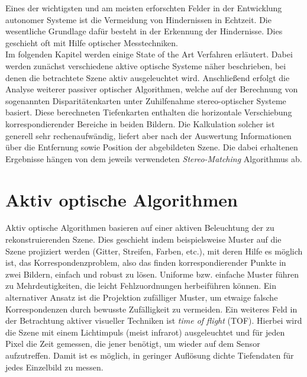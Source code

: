 Eines der wichtigsten und am meisten erforschten Felder in der Entwicklung autonomer Systeme ist die Vermeidung von Hindernissen in Echtzeit. Die wesentliche Grundlage dafür besteht in der Erkennung der Hindernisse. Dies geschieht oft mit Hilfe optischer Messtechniken.\\

\noindent
Im folgenden Kapitel werden einige State of the Art Verfahren erläutert. Dabei werden zunächst verschiedene aktive optische Systeme näher beschrieben, bei denen die betrachtete Szene aktiv ausgeleuchtet wird. Anschließend erfolgt die Analyse weiterer passiver optischer Algorithmen, welche auf der Berechnung von sogenannten Disparitätenkarten unter Zuhilfenahme stereo-optischer Systeme basiert. Diese berechneten Tiefenkarten enthalten die horizontale Verschiebung korrespondierender Bereiche in beiden Bildern. Die Kalkulation solcher ist generell sehr rechenaufwändig, liefert aber nach der Auswertung Informationen über die Entfernung sowie Position der abgebildeten Szene. Die dabei erhaltenen Ergebnisse hängen von dem jeweils verwendeten \emph{Stereo-Matching} Algorithmus ab.

\section{Aktiv optische Algorithmen}
\label{sec:kamera_basierte_he}
Aktiv optische Algorithmen basieren auf einer aktiven Beleuchtung der zu rekonstruierenden Szene. Dies geschieht indem beispielsweise Muster auf die Szene projiziert werden (Gitter, Streifen, Farben, etc.), mit deren Hilfe es möglich ist, das Korrespondenzproblem, also das finden korrespondierender Punkte in zwei Bildern, einfach und robust zu lösen. Uniforme bzw. einfache Muster führen zu Mehrdeutigkeiten, die leicht Fehlzuordnungen herbeiführen können. Ein alternativer Ansatz ist die Projektion zufälliger Muster, um etwaige falsche Korrespondenzen durch bewusste Zufälligkeit zu vermeiden. Ein weiteres Feld in der Betrachtung aktiver visueller Techniken ist \emph{time of flight} (TOF). Hierbei wird die Szene mit einem Lichtimpuls (meist infrarot) ausgeleuchtet und für jeden Pixel die Zeit gemessen, die jener benötigt, um wieder auf dem Sensor aufzutreffen. Damit ist es möglich, in geringer Auflösung dichte Tiefendaten für jedes Einzelbild zu messen.\\

